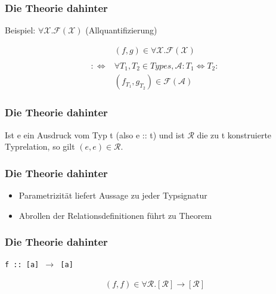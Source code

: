 \documentclass{beamer}
\begin{document}
%
%
%
%

\begin{frame}
\frametitle{Die Theorie dahinter}

Beispiel: $\forall \mathcal{X} . \mathcal{F}(\mathcal{X})$ (Allquantifizierung)

\begin{align*}
&(f, g) \in \forall \mathcal{X} . \mathcal{F}(\mathcal{X})\\
&\\
:\Leftrightarrow &
\forall T_1, T_2 \in Types, \mathcal{A} : T_1 \Leftrightarrow T_2:\\
&(f_{T_1}, g_{T_2}) \in \mathcal{F}(\mathcal{A})
\end{align*}


\end{frame}

\begin{frame}
\frametitle{Die Theorie dahinter}

\begin{Theorem}[Parametrizität]
Ist e ein Ausdruck vom Typ t (also e :: t) und ist $\mathcal{R}$ die zu t konstruierte Typrelation, so gilt
$(e, e) \in \mathcal{R}$.
\end{Theorem}

\end{frame}

\begin{frame}
\frametitle{Die Theorie dahinter}

\begin{itemize}
\item Parametrizität liefert Aussage zu jeder Typsignatur
\item Abrollen der Relationsdefinitionen führt zu Theorem
\end{itemize}

\end{frame}

\begin{frame}
\frametitle{Die Theorie dahinter}

\texttt{f :: [a] $\rightarrow$ [a]}

\begin{align*}
(f, f) \in \forall \mathcal{R} . [\mathcal{R}] \rightarrow [\mathcal{R}]
\end{align*}

\end{frame}
\end{document}
